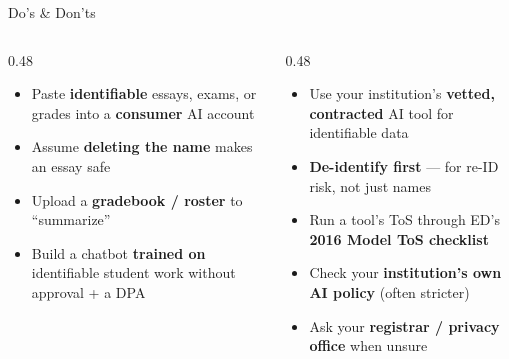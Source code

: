 \documentclass[aspectratio=169, 10pt]{beamer}
\begin{document}
\begin{frame}{Do's \& Don'ts}
\begin{columns}[T]
\begin{column}{0.48\textwidth}
\begin{tcolorbox}[dontbox, title={\faTimes\quad DON'T}]
\small
\begin{itemize}\setlength{\itemsep}{3pt}
  \item Paste \textbf{identifiable} essays, exams, or grades into a \textbf{consumer} AI account
  \item Assume \textbf{deleting the name} makes an essay safe
  \item Upload a \textbf{gradebook / roster} to ``summarize''
  \item Build a chatbot \textbf{trained on} identifiable student work without approval + a DPA
\end{itemize}
\end{tcolorbox}
\end{column}
\begin{column}{0.48\textwidth}
\begin{tcolorbox}[dobox, title={\faCheck\quad DO}]
\small
\begin{itemize}\setlength{\itemsep}{3pt}
  \item Use your institution's \textbf{vetted, contracted} AI tool for identifiable data
  \item \textbf{De-identify first} --- for re-ID risk, not just names
  \item Run a tool's ToS through ED's \textbf{2016 Model ToS checklist}
  \item Check your \textbf{institution's own AI policy} (often stricter)
  \item Ask your \textbf{registrar / privacy office} when unsure
\end{itemize}
\end{tcolorbox}
\end{column}
\end{columns}
\end{frame}
\end{document}
